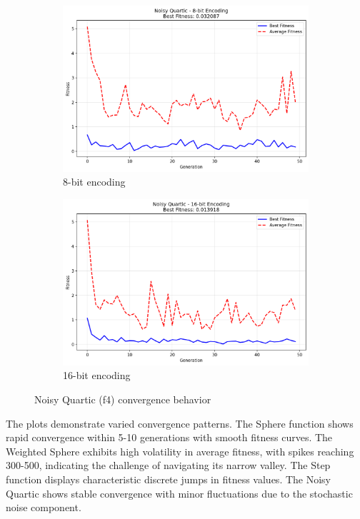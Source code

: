 \documentclass[journal,12pt,onecolumn]{IEEEtran}
\begin{document}
\begin{figure}[H]
\centering
\begin{subfigure}{0.48\textwidth}
    \includegraphics[width=\textwidth]{f4_8bit_fitness.png}
    \caption{8-bit encoding}
\end{subfigure}
\begin{subfigure}{0.48\textwidth}
    \includegraphics[width=\textwidth]{f4_16bit_fitness.png}
    \caption{16-bit encoding}
\end{subfigure}
\caption{Noisy Quartic (f4) convergence behavior}
\label{fig:f4}
\end{figure}

The plots demonstrate varied convergence patterns. The Sphere function shows rapid convergence within 5-10 generations with smooth fitness curves. The Weighted Sphere exhibits high volatility in average fitness, with spikes reaching 300-500, indicating the challenge of navigating its narrow valley. The Step function displays characteristic discrete jumps in fitness values. The Noisy Quartic shows stable convergence with minor fluctuations due to the stochastic noise component.
\end{document}
